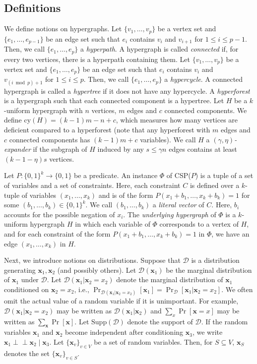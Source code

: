 \documentclass[letterpaper,11pt]{article}
\newcommand{\cald}{\mathcal{D}}
\newcommand{\cy}{\mathrm{cy}}
\newcommand{\bfx}{\mathbf{x}}
\newcommand{\ci}{\perp\!\!\!\perp}
\newcommand{\bit}{\{0,1\}}
\newcommand{\supp}{\mathrm{Supp}}
\newcommand{\csp}[1]{\textsf{CSP}(#1)\xspace}
\begin{document}
\subsection{Definitions}
We define notions on hypergraphs.
Let $\{v_1,\ldots,v_p\}$ be a vertex set and $\{e_1,\ldots,e_{p-1}\}$ be an edge set such that $e_i$ contains $v_i$ and $v_{i+1}$ for $1 \leq i \leq p-1$.
Then, we call $\{e_1,\ldots,e_p\}$ a \textit{hyperpath}.
A hypergraph is called \textit{connected} if, for every two vertices, there is a hyperpath containing them.
Let $\{v_1,\ldots,v_p\}$ be a vertex set and $\{e_1,\ldots,e_p\}$ be an edge set such that $e_i$ contains $v_i$ and $v_{(i \bmod p)+1}$ for $1 \leq i \leq p$.
Then, we call $\{e_1,\ldots,e_p\}$ a \textit{hypercycle}.
A connected hypergraph is called a \textit{hypertree} if it does not have any hypercycle.
A \textit{hyperforest} is a hypergraph such that each connected component is a hypertree.
Let $H$ be a $k$-uniform hypergraph with $n$ vertices, $m$ edges and $c$ connected components.
We define $\cy(H)=(k-1)m-n+c$, which measures how many vertices are deficient compared to a hyperforest (note that any hyperforest with $m$ edges and $c$ connected components has $(k-1)m+c$ variables).
We call $H$ a \textit{$(\gamma,\eta)$-expander} if the subgraph of $H$ induced by any $s\leq \gamma n$ edges contains at least $(k-1-\eta)s$ vertices.

Let $P:\bit^k\to\bit$ be a predicate.
An instance $\Phi$ of \csp{$P$} is a tuple of a set of variables and a set of constraints.
Here, each constraint $C$ is defined over a $k$-tuple of variables $(x_1,\ldots,x_k)$ and is of the form $P(x_1+b_1,\ldots,x_k+b_k)=1$ for some $(b_1,\ldots,b_k)\in \bit^k$.
We call $(b_1,\ldots,b_k)$ a \textit{literal vector} of $C$.
Here, $b_i$ accounts for the possible negation of $x_i$.
The \textit{underlying hypergraph} of $\Phi$ is a $k$-uniform hypergraph $H$ in which each variable of $\Phi$ corresponds to a vertex of $H$,
and for each constraint of the form $P(x_1+b_1,\ldots,x_k+b_k)=1$ in $\Phi$, 
we have an edge $(x_1,\ldots,x_k)$ in $H$.

Next, we introduce notions on distributions.
Suppose that $\cald$ is a distribution generating $\bfx_1,\bfx_2$ (and possibly others).
Let $\cald(\bfx_1)$ be the marginal distribution of $\bfx_1$ under $\cald$.
Let $\cald(\bfx_1|\bfx_2=x_2)$ denote the marginal distribution of $\bfx_1$ conditioned on $\bfx_2=x_2$, i.e., \(\Pr_{\cald(\bfx_1|\bfx_2=x_2)}[\bfx_1]=\Pr_{\cald}[\bfx_1|\bfx_2=x_2]\).
We often omit the actual value of a random variable if it is unimportant.
For example, $\cald(\bfx_1|\bfx_2=x_2)$ may be written as $\cald(\bfx_1|\bfx_2)$ and $\sum_{x}\Pr[\bfx=x]$ may be written as $\sum_{\bfx}\Pr[\bfx]$.
Let $\supp(\cald)$ denote the support of $\cald$.
If the random variables $\bfx_1$ and $\bfx_2$ become independent after conditioning $\bfx_3$, 
we write $\bfx_1 \ci \bfx_2 \mid \bfx_3$.
Let $\{\bfx_v\}_{v\in V}$ be a set of random variables.
Then, for $S\subseteq V$, $\bfx_S$ denotes the set $\{\bfx_v\}_{v\in S}$.
\end{document}
